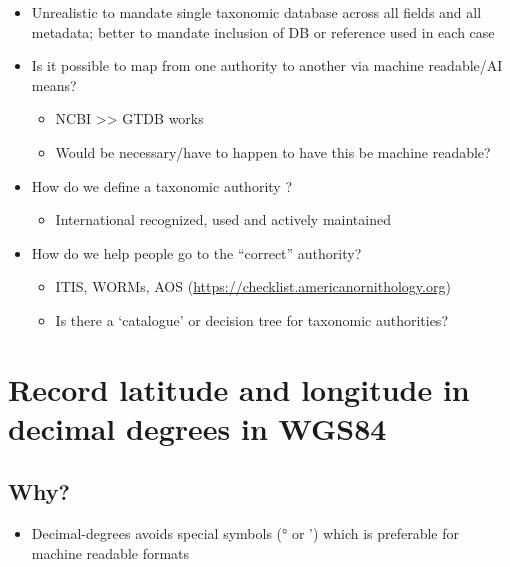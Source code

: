 \documentclass[
  oneside]{book}
\providecommand{\tightlist}{%
  \setlength{\itemsep}{0pt}\setlength{\parskip}{0pt}}
\begin{document}
\begin{itemize}
\tightlist
\item
  Unrealistic to mandate single taxonomic database across all fields and all metadata; better to mandate inclusion of DB or reference used in each case
\item
  Is it possible to map from one authority to another via machine readable/AI means?

  \begin{itemize}
  \tightlist
  \item
    NCBI \textgreater\textgreater{} GTDB works
  \item
    Would be necessary/have to happen to have this be machine readable?
  \end{itemize}
\item
  How do we define a taxonomic authority ?

  \begin{itemize}
  \tightlist
  \item
    International recognized, used and actively maintained
  \end{itemize}
\item
  How do we help people go to the ``correct'' authority?

  \begin{itemize}
  \tightlist
  \item
    ITIS, WORMs, AOS (\url{https://checklist.americanornithology.org})
  \item
    Is there a `catalogue' or decision tree for taxonomic authorities?
  \end{itemize}
\end{itemize}

\hypertarget{record-latitude-and-longitude-in-decimal-degrees-in-wgs84}{%
\section{Record latitude and longitude in decimal degrees in WGS84}\label{record-latitude-and-longitude-in-decimal-degrees-in-wgs84}}

\hypertarget{why-4}{%
\subsection{Why?}\label{why-4}}

\begin{itemize}
\tightlist
\item
  Decimal-degrees avoids special symbols (° or ') which is preferable for machine readable formats
\end{itemize}
\end{document}
